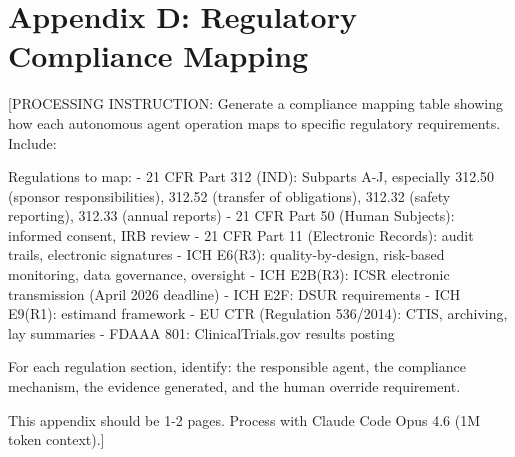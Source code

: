 \section*{Appendix D: Regulatory Compliance Mapping}

[PROCESSING INSTRUCTION: Generate a compliance mapping table showing how each
autonomous agent operation maps to specific regulatory requirements. Include:

Regulations to map:
- 21 CFR Part 312 (IND): Subparts A-J, especially 312.50 (sponsor responsibilities),
  312.52 (transfer of obligations), 312.32 (safety reporting), 312.33 (annual reports)
- 21 CFR Part 50 (Human Subjects): informed consent, IRB review
- 21 CFR Part 11 (Electronic Records): audit trails, electronic signatures
- ICH E6(R3): quality-by-design, risk-based monitoring, data governance, oversight
- ICH E2B(R3): ICSR electronic transmission (April 2026 deadline)
- ICH E2F: DSUR requirements
- ICH E9(R1): estimand framework
- EU CTR (Regulation 536/2014): CTIS, archiving, lay summaries
- FDAAA 801: ClinicalTrials.gov results posting

For each regulation section, identify: the responsible agent, the compliance mechanism,
the evidence generated, and the human override requirement.

This appendix should be 1-2 pages. Process with Claude Code Opus 4.6 (1M token context).]
